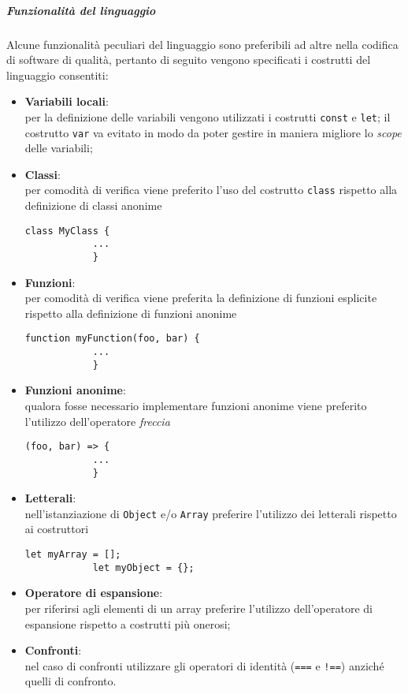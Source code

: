 \subparagraph{Funzionalità del linguaggio}

Alcune funzionalità peculiari del linguaggio sono preferibili ad altre nella codifica di software di qualità, pertanto di seguito vengono 
specificati i costrutti del linguaggio consentiti:
\begin{itemize}
	\item \textbf{Variabili locali}:\\
		per la definizione delle variabili vengono utilizzati i costrutti \texttt{const} e \texttt{let}; il costrutto \texttt{var} va 
		evitato in modo da poter gestire in maniera migliore lo \emph{scope} delle variabili;

	\item \textbf{Classi}:\\
		per comodità di verifica viene preferito l'uso del costrutto \texttt{class} rispetto alla definizione di classi anonime \\
		\begin{lstlisting}[style=htmlcssjs]
			class MyClass {
			...
			}
		\end{lstlisting}

	\item \textbf{Funzioni}:\\
		per comodità di verifica viene preferita la definizione di funzioni esplicite rispetto alla definizione di funzioni anonime \\
		\begin{lstlisting}[style=htmlcssjs]
			function myFunction(foo, bar) {
			...
			}
		\end{lstlisting}

	\item \textbf{Funzioni anonime}:\\
		qualora fosse necessario implementare funzioni anonime viene preferito l'utilizzo dell'operatore \emph{freccia}
		\begin{lstlisting}[style=htmlcssjs]
			(foo, bar) => {
			...
			}
		\end{lstlisting}


	\item \textbf{Letterali}:\\
		nell'istanziazione di \texttt{Object} e/o \texttt{Array} preferire l'utilizzo dei letterali rispetto ai costruttori
		\begin{lstlisting}[style=htmlcssjs]
			let myArray = [];
			let myObject = {};
		\end{lstlisting}

	\item \textbf{Operatore di espansione}:\\
		per riferirsi agli elementi di un array preferire l'utilizzo dell'operatore di espansione rispetto a costrutti più onerosi;

	\item \textbf{Confronti}:\\
		nel caso di confronti utilizzare gli operatori di identità (\texttt{===} e \texttt{!==}) anziché quelli di confronto.
\end{itemize}

